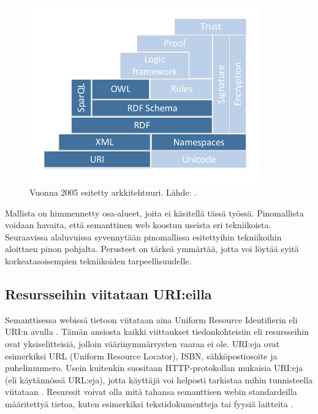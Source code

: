 \documentclass[finnish, 12pt, a4paper, elec, utf8, pdfa, online]{aaltothesis}
\begin{document}
\begin{figure}[htb]
\centering
\includegraphics[width=10cm]{images/sweb-stack2.pdf}
\caption{Vuonna 2005 esitetty arkkitehtuuri. Lähde: \cite{stack}. \label{images/sweb-stack2.pdf}}
\end{figure}

Mallista on himmennetty osa-alueet, joita ei käsitellä tässä työssä. Pinomallista voidaan havaita, että semanttinen web koostuu useista eri tekniikoista. Seuraavissa alaluvuissa syvennytään pinomallissa esitettyihin tekniikoihin aloittaen pinon pohjalta. Perusteet on tärkeä ymmärtää, jotta voi löytää syitä korkeatasoisempien tekniikoiden tarpeellisuudelle.

\subsection{Resursseihin viitataan URI:eilla}
Semanttisessa webissä tietoon viitataan aina Uniform Resource Identifierin eli URI:n avulla \cite{RDF_specification}. Tämän ansiosta kaikki viittaukset tiedonkohteisiin eli resursseihin ovat yksiselitteisiä, jolloin väärinymmärrysten vaaraa ei ole. URI:eja ovat esimerkiksi URL (Uniform Resource Locator), ISBN, sähköpostiosoite ja puhelinnumero. Usein kuitenkin suositaan HTTP-protokollan mukaisia URI:eja (eli käytännössä URL:eja), jotta käyttäjä voi helposti tarkistaa mihin tunnisteella viitataan \cite{cambridge_linked}. Resurssit voivat olla mitä tahansa semanttisen webin standardeilla määritettyä tietoa, kuten esimerkiksi tekstidokumentteja tai fyysiä laitteita \cite{RDF_specification}.
\end{document}
